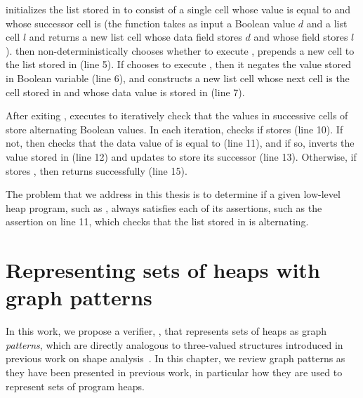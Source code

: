 \altlist initializes the list stored in \lsnm to consist of a single
cell whose value is equal to \datavarnm and whose successor cell is
\nilconst (the function \consls takes as input a Boolean value $d$ and
a list cell $l$ and returns a new list cell whose data field stores
$d$ and whose \nextnm field stores $l$).
%
\altlist then non-deterministically chooses whether to execute
\consloop, prepends a new cell to the list stored in \lsnm (line 5).
%
If \altlist chooses to execute \consloop, then it negates the value
stored in Boolean variable \datanm (line 6), and constructs a new list
cell whose next cell is the cell stored in \lsnm and whose data value
is stored in \datanm (line 7).

After exiting \consloop, \altlist executes \chkloop to iteratively
check that the values in successive cells of \lsnm store alternating
Boolean values.
%
In each iteration, \altlist checks if \lsnm stores \nilconst (line
10).
%
If not, then \altlist checks that the data value of \lsnm is equal to
\datanm (line 11), and if so, inverts the value stored in \datanm
(line 12) and updates \lsnm to store its successor (line 13).
%
Otherwise, if \lsnm stores \nilconst, then \altlist returns
successfully (line 15).

The problem that we address in this thesis is to determine if a given
low-level heap program, such as \altlist, always satisfies each of its
assertions, such as the assertion on line 11, which checks that the
list stored in \lsnm is alternating.

\section{Representing sets of heaps with graph patterns}
\label{sec:ex-patterns}
In this work, we propose a verifier, \verifier, that represents sets
of heaps as graph \emph{patterns}, which are directly analogous to
three-valued structures introduced in previous work on shape
analysis~\cite{sagiv02}.
%
In this chapter, we review graph patterns as they have been presented
in previous work, in particular how they are used to represent sets of
program heaps.

